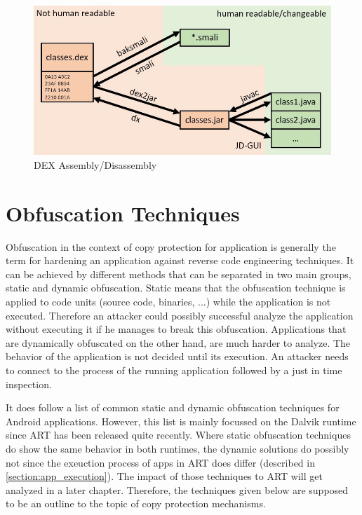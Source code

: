 \begin{figure}[htb]
  \includegraphics[width=\textwidth]{figures/dex_disassembly}
  \caption[DEX Assembly/Disassembly]{DEX Assembly/Disassembly}
  \label{fig:dex_disassembly}
\end{figure}


\section{Obfuscation Techniques}
Obfuscation in the context of copy protection for application
is generally the term for hardening an application against
reverse code engineering techniques. It can be achieved by different methods
that can be separated in two main groups, static and dynamic obfuscation.
Static means that the obfuscation technique is applied to code units (source
code, binaries, ...) while the application is not executed. Therefore an
attacker could possibly successful analyze the application without executing it
if he manages to break this obfuscation. Applications that are dynamically
obfuscated on the other hand, are much harder to analyze. The behavior
of the application is not decided until its execution. An attacker needs to connect to the process of the running application followed by a just in time inspection.

It does follow a list of common static and dynamic obfuscation techniques
for Android applications. However, this list is mainly focussed on
the Dalvik runtime since ART has been released quite recently.
Where static obfuscation techniques do show the same behavior in both
runtimes, the dynamic solutions do possibly not since the exeuction process
of apps in ART does differ (described in \autoref{section:app_execution}).
The impact of those techniques to ART will get analyzed in a later chapter.
Therefore, the techniques given below are supposed to be an outline to
the topic of copy protection mechanisms.


